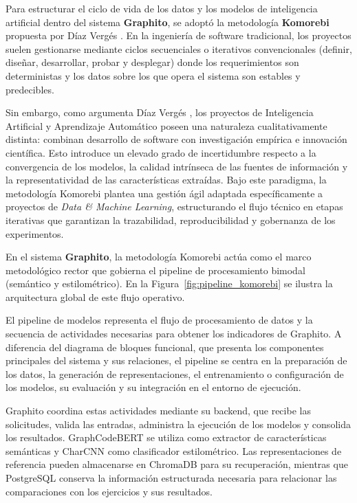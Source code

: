 Para estructurar el ciclo de vida de los datos y los modelos de inteligencia artificial dentro del sistema \textbf{Graphito}, se adoptó la metodología \textbf{Komorebi} propuesta por Díaz Vergés \cite{verges_como_2023}. En la ingeniería de software tradicional, los proyectos suelen gestionarse mediante ciclos secuenciales o iterativos convencionales (definir, diseñar, desarrollar, probar y desplegar) donde los requerimientos son deterministas y los datos sobre los que opera el sistema son estables y predecibles.

Sin embargo, como argumenta Díaz Vergés \cite{verges_como_2023}, los proyectos de Inteligencia Artificial y Aprendizaje Automático poseen una naturaleza cualitativamente distinta: combinan desarrollo de software con investigación empírica e innovación científica. Esto introduce un elevado grado de incertidumbre respecto a la convergencia de los modelos, la calidad intrínseca de las fuentes de información y la representatividad de las características extraídas. Bajo este paradigma, la metodología Komorebi plantea una gestión ágil adaptada específicamente a proyectos de \textit{Data \& Machine Learning}, estructurando el flujo técnico en etapas iterativas que garantizan la trazabilidad, reproducibilidad y gobernanza de los experimentos.

En el sistema \textbf{Graphito}, la metodología Komorebi actúa como el marco metodológico rector que gobierna el pipeline de procesamiento bimodal (semántico y estilométrico). En la Figura~\ref{fig:pipeline_komorebi} se ilustra la arquitectura global de este flujo operativo.

El pipeline de modelos representa el flujo de procesamiento de datos y la secuencia de actividades necesarias para obtener los indicadores de Graphito. A diferencia del diagrama de bloques funcional, que presenta los componentes principales del sistema y sus relaciones, el pipeline se centra en la preparación de los datos, la generación de representaciones, el entrenamiento o configuración de los modelos, su evaluación y su integración en el entorno de ejecución.

Graphito coordina estas actividades mediante su backend, que recibe las solicitudes, valida las entradas, administra la ejecución de los modelos y consolida los resultados. GraphCodeBERT se utiliza como extractor de características semánticas y CharCNN como clasificador estilométrico. Las representaciones de referencia pueden almacenarse en ChromaDB para su recuperación, mientras que PostgreSQL conserva la información estructurada necesaria para relacionar las comparaciones con los ejercicios y sus resultados.

